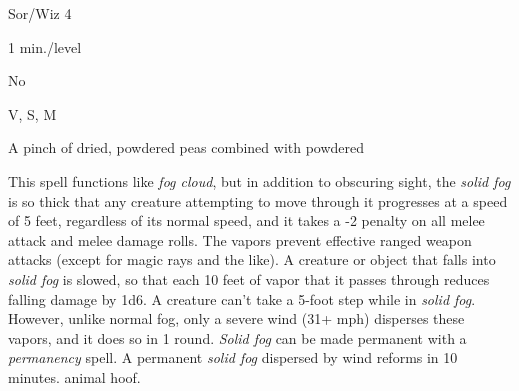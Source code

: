 
\begin{description*}
\item[Level:] Sor/Wiz 4
\item[Duration:] 1 min./level
\item[Spell Resistance:] No
\item[Components:] V, S, M
\item[Arcane Material Component:] A pinch of dried, powdered peas combined with powdered
\end{description*}

This spell functions like \textit{fog cloud}, but in addition to obscuring sight,
the \textit{solid fog} is so thick that any creature attempting to move through
it progresses at a speed of 5 feet, regardless of its normal speed, and it takes
a -2 penalty on all melee attack and melee damage rolls. The vapors prevent effective
ranged weapon attacks (except for magic rays and the like). A creature or object
that falls into \textit{solid fog} is slowed, so that each 10 feet of vapor that
it passes through reduces falling damage by 1d6. A creature can't take a 5-foot
step while in \textit{solid fog}.
However, unlike normal fog, only a severe wind (31+ mph) disperses these vapors,
and it does so in 1 round.
\textit{Solid fog} can be made permanent with a \textit{permanency} spell. A permanent
\textit{solid fog} dispersed by wind reforms in 10 minutes.
animal hoof.
